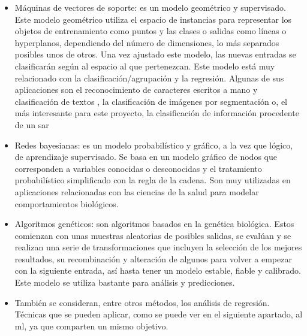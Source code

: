 \begin{itemize}
	\item Máquinas de vectores de soporte: es un modelo geométrico y supervisado. Este modelo geométrico utiliza el espacio de instancias para representar los objetos de entrenamiento como puntos y las clases o salidas como líneas o hyperplanos, dependiendo del número de dimensiones, lo más separados posibles unos de otros. Una vez ajustado este modelo, las nuevas entradas se clasificarán según al espacio al que pertenezcan. Este modelo está muy relacionado con la clasificación/agrupación y la regresión. Algunas de sus aplicaciones son el reconocimiento de caracteres escritos a mano \cite{MLhand} y clasificación de textos \citep{MLText}, la clasificación de imágenes por segmentación \citep{MLimg} o, el más interesante para este proyecto, la clasificación de información procedente de un \gls{sar} \citep{MLSAR}
	\item Redes bayesianas: es un modelo probabilístico y gráfico, a la vez que lógico, de aprendizaje supervisado. Se basa en un modelo gráfico de nodos que corresponden a variables conocidas o desconocidas y el tratamiento probabilístico simplificado con la regla de la cadena. Son muy utilizadas en aplicaciones relacionadas con las ciencias de la salud para modelar comportamientos biológicos. 
	\item Algoritmos genéticos: son algoritmos basados en la genética biológica. Estos comienzan con unas muestras aleatorias de posibles salidas, se evalúan y se realizan una serie de transformaciones que incluyen la selección de los mejores resultados, su recombinación y alteración de algunos para volver a empezar con la siguiente entrada, así hasta tener un modelo estable, fiable y calibrado. Este modelo se utiliza bastante para análisis y predicciones.
	\item También se consideran, entre otros métodos, los análisis de regresión. Técnicas que se pueden aplicar, como se puede ver en el siguiente apartado, al \gls{ml}, ya que comparten un mismo objetivo. 
\end{itemize}
